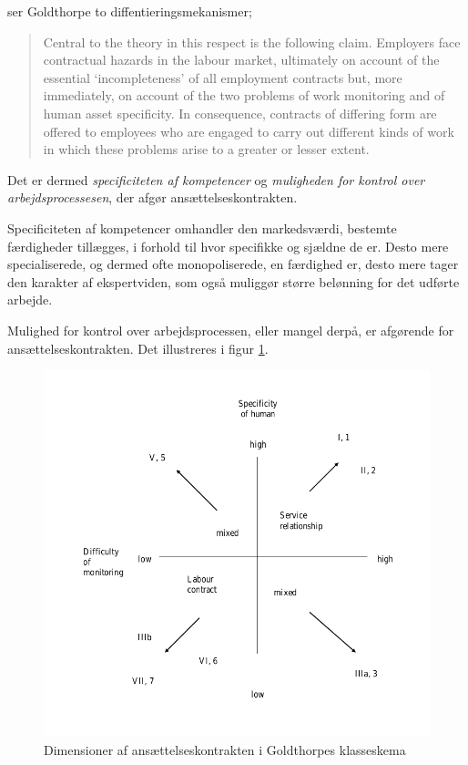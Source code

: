 ser Goldthorpe to diffentieringsmekanismer;

%
\begin{quote} \small %
Central to the theory in this respect is the following claim. Employers face contractual hazards in the labour market, ultimately on account of the essential ‘incompleteness’ of all employment contracts but, more immediately, on account of the two problems of work monitoring and of human asset specificity. In consequence, contracts of differing form are offered to employees who are engaged to carry out different kinds of work in which these problems arise to a greater or lesser extent.  
\end{quote}
%

Det er dermed \emph{specificiteten af kompetencer} og \emph{muligheden for kontrol over arbejdsprocessesen}, der afgør ansættelseskontrakten. 

Specificiteten af kompetencer omhandler den markedsværdi, bestemte færdigheder tillægges, i forhold til hvor specifikke og sjældne de er. Desto mere specialiserede, og dermed ofte monopoliserede, en færdighed er, desto mere tager den karakter af ekspertviden, som også muliggør større belønning for det udførte arbejde.

Mulighed for kontrol over arbejdsprocessen, eller mangel derpå, er afgørende for ansættelseskontrakten. Det illustreres i figur \ref{fig_teori_klasse_Goldthorpe_arbejdskontraktdimensioner}. 

\begin{figure}[H]
\begin{centering}
	\includegraphics[width=\textwidth]{fig/Goldthorpe_ansaettelseskontrakt.png}
	\caption{Dimensioner af ansættelseskontrakten i Goldthorpes klasseskema}
	\label{fig_teori_klasse_Goldthorpe_arbejdskontraktdimensioner}
\end{centering}
\end{figure}

